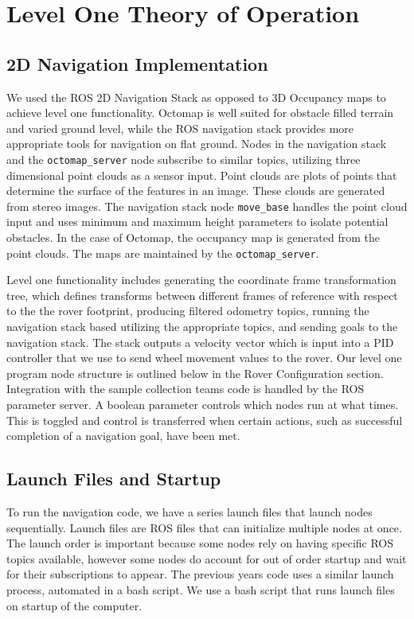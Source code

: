 \documentclass[10pt, oneside,onecolumn]{IEEEtran}
\begin{document}
\section{Level One Theory of Operation}
\subsection{2D Navigation Implementation}
We used the ROS 2D Navigation Stack as opposed to 3D Occupancy maps to achieve level one functionality. Octomap is well suited for obstacle filled terrain and varied ground level, while the ROS navigation stack provides more appropriate tools for navigation on flat ground. Nodes in the navigation stack and the \texttt{octomap\_server} node subscribe to similar topics, utilizing three dimensional point clouds as a sensor input. Point clouds are plots of points that determine the surface of the features in an image. These clouds are generated from stereo images. The navigation stack node \texttt{move\_base} handles the point cloud input and uses minimum and maximum height parameters to isolate potential obstacles. In the case of Octomap, the occupancy map is generated from the point clouds. The maps are maintained by the \texttt{octomap\_server}.

Level one functionality includes generating the coordinate frame transformation tree, which defines transforms between different frames of reference with respect to the the rover footprint, producing filtered odometry topics, running the navigation stack based utilizing the appropriate topics, and sending goals to the navigation stack. The stack outputs a velocity vector which is input into a PID controller that we use to send wheel movement values to the rover. Our level one program node structure is outlined below in the Rover Configuration section. Integration with the sample collection teams code is handled by the ROS parameter server. A boolean parameter controls which nodes run at what times. This is toggled and control is transferred when certain actions, such as successful completion of a navigation goal, have been met. 

\subsection{Launch Files and Startup}
To run the navigation code, we have a series launch files that launch nodes sequentially. Launch files are ROS files that can initialize multiple nodes at once. The launch order is important because some nodes rely on having specific ROS topics available, however some nodes do account for out of order startup and wait for their subscriptions to appear. The previous years code uses a similar launch process, automated in a bash script. We use a bash script that runs launch files on startup of the computer.
\end{document}
